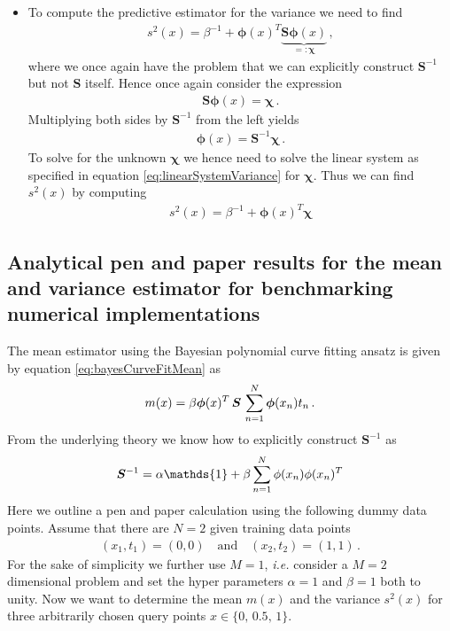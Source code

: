 \documentclass[11pt, DINA4, fleqn]{amsart}
\begin{document}
\begin{itemize}
	\item To compute the predictive estimator for the variance we need to find
	\begin{align}
	s^2(x) = \beta^{-1} + \bm{\phi}(x)^T\underbrace{\bm{S}\bm{\phi}(x)}_{=:\bm{\chi}} \, ,
	\end{align}
	where we once again have the problem that we can explicitly construct $\bm{S}^{-1}$ but not $\bm{S}$ itself. Hence once again consider the expression
	\begin{align}
	\bm{S}\bm{\phi}(x) = \bm{\chi} \, .
	\end{align}
	Multiplying both sides by $\bm{S}^{-1}$ from the left yields
	\begin{align}
	\bm{\phi}(x) = \bm{S}^{-1}\bm{\chi} \, .
	\label{eq:linearSystemVariance}
	\end{align}
	To solve for the unknown $\bm{\chi}$ we hence need to solve the linear system as specified in equation \eqref{eq:linearSystemVariance} for $\bm{\chi}$. Thus we can find $s^2(x)$ by computing
	\begin{align}
	s^2(x) = \beta^{-1} + \bm{\phi}(x)^T\bm{\chi}
	\end{align}	
\end{itemize}

\subsection{Analytical pen and paper results for the mean and variance estimator for benchmarking numerical implementations}
The mean estimator using the Bayesian polynomial curve fitting ansatz is given by equation \eqref{eq:bayesCurveFitMean} as
\begin{align}
m(x) = \beta \bm{\phi}(x)^T \, \bm{S} \, \sum\displaylimits_{n=1}^{N}\bm{\phi}(x_n)t_n \, .
\end{align}
From the underlying theory we know how to explicitly construct $\bm{S}^{-1}$ as
\begin{align}
\bm{S}^{-1} = \alpha\mathds{1} + \beta \sum\displaylimits_{n=1}^{N} \phi(x_n)\phi(x_n)^T
\label{eq:Sinv}
\end{align}
Here we outline a pen and paper calculation using the following dummy data points. Assume that there are $N=2$ given training data points
\begin{align}
(x_1, t_1) = (0, 0) \quad \text{and} \quad (x_2, t_2) = (1, 1)\, .
\end{align}
For the sake of simplicity we further use $M=1$, \textit{i.e.} consider a $M=2$ dimensional problem and set the hyper parameters $\alpha = 1$ and $\beta =1$ both to unity.
Now we want to determine the mean $m(x)$ and the variance $s^2(x)$ for three arbitrarily chosen query points $x\in\{0,\, 0.5,\, 1\}$.
\end{document}
